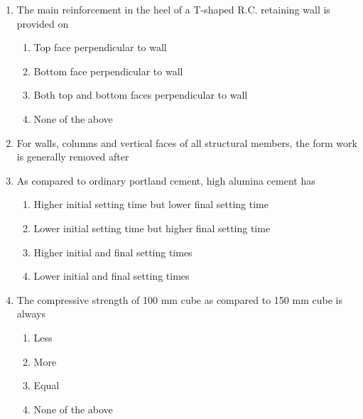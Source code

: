 \documentclass[11pt,a4paper]{article}
\begin{document}
\begin{enumerate}
\\\begin{enumerate*}[itemjoin=\qquad, label=\Alph*.]
\item{50 mm}
\item{75 mm}
\item{100 mm}
\item{120 mm}
\end{enumerate*}
\item{The main reinforcement in the heel of a T-shaped R.C. retaining wall is provided on}
\begin{enumerate}[label=\Alph*.]
\item{Top face perpendicular to wall}
\item{Bottom face perpendicular to wall}
\item{Both top and bottom faces perpendicular to wall}
\item{None of the above}
\end{enumerate}
\item{For walls, columns and vertical faces of all structural members, the form work is generally removed after}
\\
\item{As compared to ordinary portland cement, high alumina cement has}
\begin{enumerate}[label=\Alph*.]
\item{Higher initial setting time but lower final setting time}
\item{Lower initial setting time but higher final setting time}
\item{Higher initial and final setting times}
\item{Lower initial and final setting times}
\end{enumerate}
\item{The compressive strength of 100 mm cube as compared to 150 mm cube is always}
\begin{enumerate}[label=\Alph*.]
\item{Less}
\item{More}
\item{Equal}
\item{None of the above}
\end{enumerate}

\end{enumerate}
\end{document}
